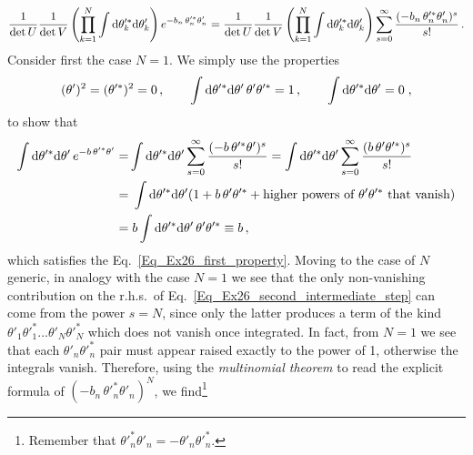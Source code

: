 \begin{sol}
    \begin{equation}
        \frac{1}{\det U}\frac{1}{\det V} \left(\prod_{k=1}^{N} \int {\rm d} \theta_k'^{*} {\rm d}\theta'_k \right) e^{- b_{n}\, \theta'^{*}_{n} \theta'_{n}} 
        = \frac{1}{\det U}\frac{1}{\det V} \left(\prod_{k=1}^{N} \int {\rm d} \theta_k'^{*} {\rm d}\theta'_k \right) \sum_{s=0}^{\infty} \frac{(- b_{n}\, \theta'^{*}_{n} \theta'_{n})^s}{s!} \, .
        \label{Eq_Ex26_second_intermediate_step}
    \end{equation}
    Consider first the case $N=1$. We simply use the properties
    \begin{equation}
        (\theta')^2 = (\theta'^{*})^2 = 0 \, ,
        \qquad
        \int {\rm d} \theta'^{*} {\rm d}\theta' \, \theta' \theta'^{*} = 1 \, ,
        \qquad
        \int {\rm d} \theta'^{*} {\rm d}\theta' = 0 \; ,
        \label{Eq_Ex26_second_property}
    \end{equation}
    to show that
    \begin{equation}
    \begin{split}
        \int {\rm d} \theta'^{*} {\rm d}\theta' \, e^{- b\, \theta'^{*} \theta'} 
        = & \int {\rm d} \theta'^{*} {\rm d}\theta' \sum_{s = 0}^{\infty} \frac{(- b\, \theta'^{*} \theta')^s}{s!} 
        = \int {\rm d} \theta'^{*} {\rm d} \theta' \sum_{s = 0}^{\infty} \frac{(b\, \theta' \theta'^{*})^s}{s!} \\
        = &\; \int {\rm d} \theta'^{*} {\rm d}\theta' (1 + b\, \theta' \theta'^{*} + \text{higher powers of $\theta' \theta'^{*}$ that vanish}) \\
        = &\; b \int {\rm d} \theta'^{*} {\rm d}\theta' \,  \theta' \theta'^{*} \equiv b \, ,
    \end{split}
    \end{equation}
    which satisfies the Eq.~\eqref{Eq_Ex26_first_property}. Moving to the case of $N$ generic, in analogy with the case $N=1$ we see that the only non-vanishing contribution on the r.h.s.~of Eq.~\eqref{Eq_Ex26_second_intermediate_step} can come from the power $s = N$, since only the latter produces a term of the kind $\theta'_1 \theta'^{*}_1 ... \theta'_N \theta'^{*}_N$ which does not vanish once integrated. In fact, from $N=1$ we see that each $\theta'_n \theta'^{*}_n$ pair must appear raised exactly to the power of 1, otherwise the integrals vanish. Therefore, using the \emph{multinomial theorem} to read the explicit formula of $(- b_{n}\, \theta'^{*}_{n} \theta'_{n})^N$, we find\footnote{Remember that $\theta'^{*}_{n} \theta'_{n} = - \theta'_{n} \theta'^{*}_{n}$.}

\end{sol}
